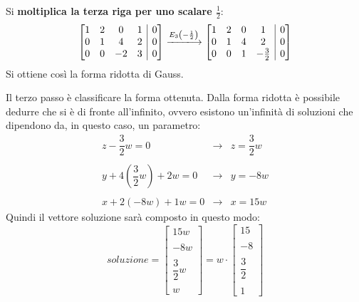 \documentclass[a4paper]{article}
\makeatletter
\newenvironment{rowequmatbra}[1]{\left[\array{@{}#1@{}}}{\endarray\right]}
\makeatother
\begin{document}
	Si \textbf{moltiplica la terza riga per uno scalare $\frac{1}{2}$}:
	\begin{equation*}
		\begin{rowequmatbra}{cccc|c}
			1  &  2 &  0 &  1 & 0 	\\
			0  &  1 &  4 &  2 & 0	\\
			0  &  0 & -2 &  3 & 0
		\end{rowequmatbra} \xlongrightarrow{E_{3}\left(-\frac{1}{2}\right)}
		\begin{rowequmatbra}{cccc|c}
			1  &  2 &  0 &  1 & 0 	\\
			0  &  1 &  4 &  2 & 0	\\
			0  &  0 &  1 &  -\frac{3}{2} & 0
		\end{rowequmatbra}
	\end{equation*}
	Si ottiene così la forma ridotta di Gauss.\newpage
	
	\noindent
	Il \textcolor{Red3}{terzo passo} è classificare la forma ottenuta. Dalla forma ridotta è possibile dedurre che si è di fronte all'infinito, ovvero esistono un'infinità di soluzioni che dipendono da, in questo caso, un parametro:
	\begin{equation*}
		\begin{array}{rll}
			z - \dfrac{3}{2} w = 0 & \longrightarrow & z = \dfrac{3}{2} w \\
			\\
			y + 4\left(\dfrac{3}{2}w\right) + 2w = 0 & \longrightarrow & y = -8w \\
			\\
			x + 2\left(-8w\right) + 1w = 0 & \longrightarrow & x = 15w
		\end{array}
	\end{equation*}
	Quindi il vettore soluzione sarà composto in questo modo:
	\begin{equation*}
		soluzione = \begin{bmatrix}
			15w \\
			\\
			-8w \\
			\\
			\dfrac{3}{2}w \\
			\\
			w
		\end{bmatrix} = w \cdot \begin{bmatrix}
			15 \\
			\\
			-8 \\
			\\
			\dfrac{3}{2} \\
			\\
			1
		\end{bmatrix}
	\end{equation*}\newpage
\end{document}
